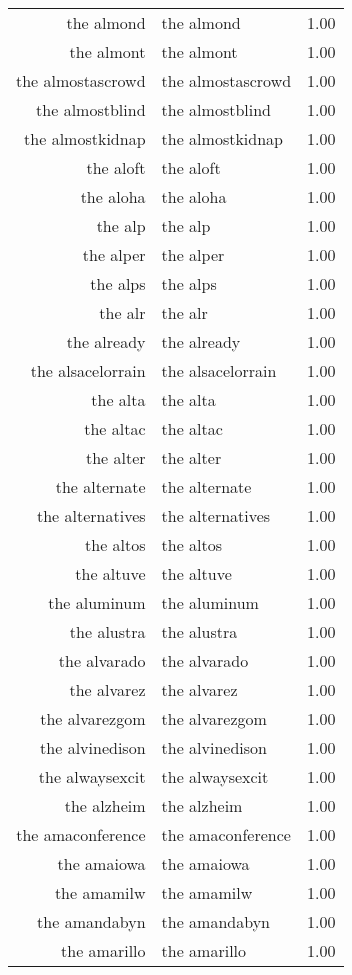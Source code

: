 \begin{table}[ht]
\begin{tabular}{rlr}
  the almond & the almond & 1.00 \\ 
  the almont & the almont & 1.00 \\ 
  the almostascrowd & the almostascrowd & 1.00 \\ 
  the almostblind & the almostblind & 1.00 \\ 
  the almostkidnap & the almostkidnap & 1.00 \\ 
  the aloft & the aloft & 1.00 \\ 
  the aloha & the aloha & 1.00 \\ 
  the alp & the alp & 1.00 \\ 
  the alper & the alper & 1.00 \\ 
  the alps & the alps & 1.00 \\ 
  the alr & the alr & 1.00 \\ 
  the already & the already & 1.00 \\ 
  the alsacelorrain & the alsacelorrain & 1.00 \\ 
  the alta & the alta & 1.00 \\ 
  the altac & the altac & 1.00 \\ 
  the alter & the alter & 1.00 \\ 
  the alternate & the alternate & 1.00 \\ 
  the alternatives & the alternatives & 1.00 \\ 
  the altos & the altos & 1.00 \\ 
  the altuve & the altuve & 1.00 \\ 
  the aluminum & the aluminum & 1.00 \\ 
  the alustra & the alustra & 1.00 \\ 
  the alvarado & the alvarado & 1.00 \\ 
  the alvarez & the alvarez & 1.00 \\ 
  the alvarezgom & the alvarezgom & 1.00 \\ 
  the alvinedison & the alvinedison & 1.00 \\ 
  the alwaysexcit & the alwaysexcit & 1.00 \\ 
  the alzheim & the alzheim & 1.00 \\ 
  the amaconference & the amaconference & 1.00 \\ 
  the amaiowa & the amaiowa & 1.00 \\ 
  the amamilw & the amamilw & 1.00 \\ 
  the amandabyn & the amandabyn & 1.00 \\ 
  the amarillo & the amarillo & 1.00 \\ 

\end{tabular}
\end{table}
